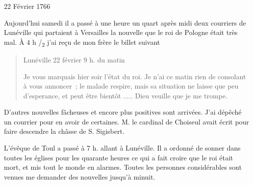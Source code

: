                      \begin{diary}{22 Février 1766}{}
                        
                         Aujourd'hui samedi il a passé à une
                           heure
                           un quart après midi deux courriers de
                           Lunéville qui
                           partaient à Versailles la
                           nouvelle
                           que le roi de Pologne était très mal. À 4 h /\textsubscript{2}
                           j'ai reçu de mon frère le billet
                           suivant \bigskip
        
        
                        \begin{quote}\begin{flushright}Lunéville
                              22 février 9 h. du matin\end{flushright}
                              Je vous marquais hier soir l'état du roi. Je
                              n'ai ce matin rien de consolant à vous
                              annoncer ; le malade respire, mais sa
                              situation ne laisse que peu d'esperance, et
                              peut être bientôt ..... Dieu veuille que je me trompe. \bigskip
        
        \end{quote}
                         D'autres nouvelles fâcheuses et encore
                           plus
                           positives sont arrivées. J'ai dépêché un
                           courrier pour en avoir de certaines. M.
                              le cardinal de Choiseul avait écrit pour
                           faire descendre la châsse de S.
                           Sigisbert.
                        \bigskip
        
        
                        
                           L'évêque de Toul a passé à 7 h.
                           allant
                           à Lunéville. Il a ordonné
                           de sonner dans
                           toutes les églises pour les quarante heures
                           ce qui a fait croire que le
                              roi était mort,
                           et mis tout le monde en alarmes. Toutes
                           les personnes considérables sont venues me
                           demander des nouvelles jusqu'à minuit. \bigskip
        

\end{diary}
